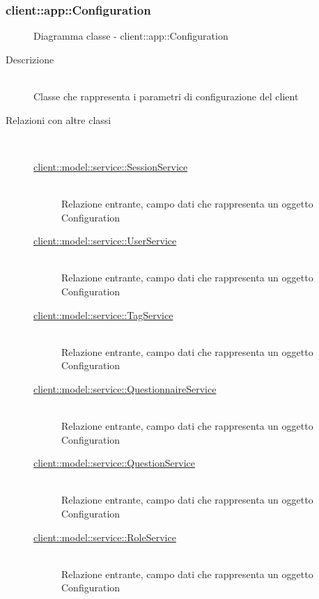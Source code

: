 \subsubsection[Configuration]{client::app::Configuration}
\begin{figure}[H]
	\centering
	\caption{Diagramma classe - client::app::Configuration}
\end{figure}\begin{description}
\item[Descrizione] \hfill \\
Classe che rappresenta i parametri di configurazione del client
\item[Relazioni con altre classi] \hfill \\
\vspace{-7mm}
\begin{description}
	\item[\hyperlink{client::model::service::SessionService}{client::model::service::SessionService}] \hfill \\
	Relazione entrante, campo dati che rappresenta un oggetto Configuration
	\item[\hyperlink{client::model::service::UserService}{client::model::service::UserService}] \hfill \\
	Relazione entrante, campo dati che rappresenta un oggetto Configuration
	\item[\hyperlink{client::model::service::TagService}{client::model::service::TagService}] \hfill \\
	Relazione entrante, campo dati che rappresenta un oggetto Configuration
	\item[\hyperlink{client::model::service::QuestionnaireService}{client::model::service::QuestionnaireService}] \hfill \\
	Relazione entrante, campo dati che rappresenta un oggetto Configuration
	\item[\hyperlink{client::model::service::QuestionService}{client::model::service::QuestionService}] \hfill \\
	Relazione entrante, campo dati che rappresenta un oggetto Configuration
	\item[\hyperlink{client::model::service::RoleService}{client::model::service::RoleService}] \hfill \\
	Relazione entrante, campo dati che rappresenta un oggetto Configuration
\end{description}


\end{description}
